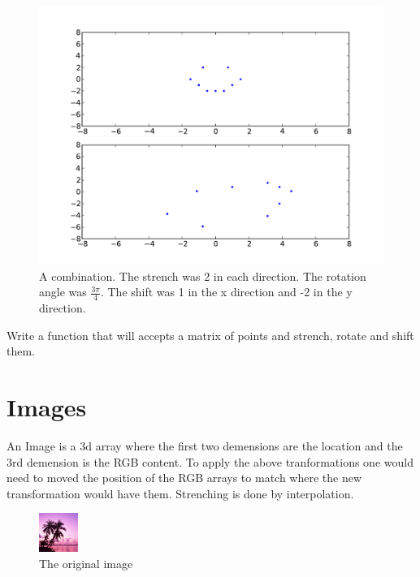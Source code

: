 \begin{figure}[H]
\includegraphics[scale = .5]{combo.pdf}
\caption{A combination. The strench was 2 in each direction. The rotation angle was $\frac{3\pi}{4}$. The shift was 1 in the x direction and -2 in the y direction.}
\end{figure}

\begin{problem}
Write a function that will accepts a matrix of points and strench, rotate and shift them.
\end{problem}

\section*{Images}

An Image is a 3d array where the first two demensions are the location and the 3rd demension is the RGB content. To apply the above tranformations one would need to moved the position of the RGB arrays to match where the new transformation would have them. Strenching is done by
 interpolation.

\begin{figure}[H]
\includegraphics[scale = 2.0]{dream.png}
\caption{The original image}
\end{figure}

